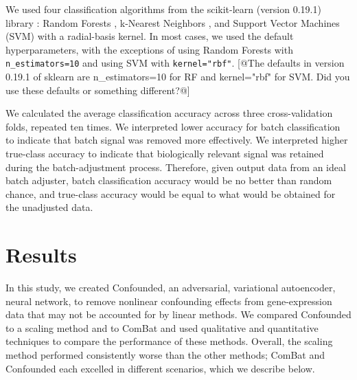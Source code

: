 We used four classification algorithms from the scikit-learn (version 0.19.1) library \cite{pedregosa_scikit-learn_2011}: Random Forests \citep{tin_kam_ho_random_1995}, k-Nearest Neighbors \citep{fix_discriminatory_1951}, and Support Vector Machines (SVM) \citep{cortes_support-vector_1995} with a radial-basis kernel.
In most cases, we used the default hyperparameters, with the exceptions of using Random Forests with \texttt{n\_estimators=10} and using SVM with \texttt{kernel="rbf"}.
[@The defaults in version 0.19.1 of sklearn are n\_estimators=10 for RF and kernel="rbf" for SVM. Did you use these defaults or something different?@] %

We calculated the average classification accuracy across three cross-validation folds, repeated ten times.
We interpreted lower accuracy for batch classification to indicate that batch signal was removed more effectively.
We interpreted higher true-class accuracy to indicate that biologically relevant signal was retained during the batch-adjustment process.
Therefore, given output data from an ideal batch adjuster, batch classification accuracy would be no better than random chance, and true-class accuracy would be equal to what would be obtained for the unadjusted data.

\section{Results} \label{sec:results}

In this study, we created Confounded, an adversarial, variational autoencoder, neural network, to remove nonlinear confounding effects from gene-expression data that may not be accounted for by linear methods.
We compared Confounded to a scaling method and to ComBat \citep{johnson_adjusting_2007} and used qualitative and quantitative techniques to compare the performance of these methods.
Overall, the scaling method performed consistently worse than the other methods;
ComBat and Confounded each excelled in different scenarios, which we describe below.


